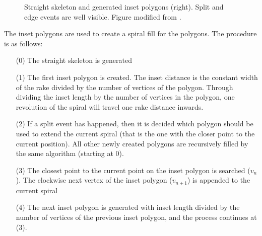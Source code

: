 \begin{figure}
\caption{Straight skeleton and generated inset polygons (right). Split and edge events are well visible. Figure modified from \cite{Aichholzer:jucs_1_12:a_novel_type_of}.}
\end{figure}


The inset polygons are used to create a spiral fill for the polygons. The procedure is as follows:

\begin{itemize}
\item[(0)] The straight skeleton is generated
\item[(1)] The first inset polygon is created. The inset distance is the constant width of the rake divided by the number of vertices of the polygon. Through dividing the inset length by the number of vertices in the polygon, one revolution of the spiral will travel one rake distance inwards.
\item[(2)] If a split event has happened, then it is decided which polygon should be used to extend the current spiral (that is the one with the closer point to the current position). All other newly created polygons are recursively filled by the same algorithm (starting at 0). %
\item[(3)] The closest point to the current point on the inset polygon is searched ($v_n$). The clockwise next vertex of the inset polygon ($v_{n+1}$) is appended to the current spiral
\item[(4)] The next inset polygon is generated with inset length divided by the number of vertices of the previous inset polygon, and the process continues at (3).

\end{itemize}

